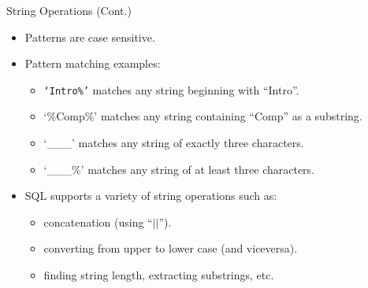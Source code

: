 \documentclass{beamer}
\begin{document}

\begin{frame}[fragile]{String Operations (Cont.)}
    \begin{itemize}
        \item Patterns are case sensitive.
        \item Pattern matching examples:
        \begin{itemize}
            \item \texttt{`Intro\%'} matches any string beginning with ``Intro''.
            \item `\%Comp\%' matches any string containing ``Comp'' as a substring.
            \item `\_\_\_' matches any string of exactly three characters.
            \item `\_\_\_\%' matches any string of at least three characters.
        \end{itemize}
        \item SQL supports a variety of string operations such as:
        \begin{itemize}
            \item concatenation (using ``$| |$'').
            \item converting from upper to lower case (and viceversa).
            \item finding string length, extracting substrings, etc.
        \end{itemize}
    \end{itemize}
\end{frame}
\end{document}

